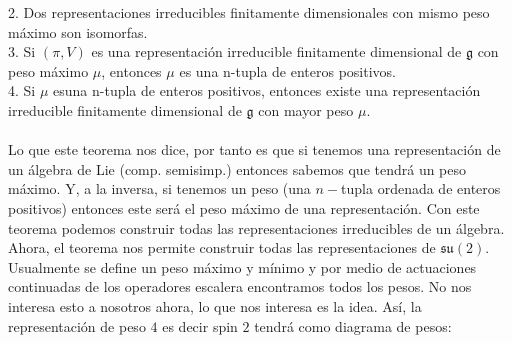 \documentclass[12pt]{article}
\begin{document}
2. Dos representaciones irreducibles finitamente dimensionales con mismo peso máximo son isomorfas. \\
3. Si $(\pi,V)$ es una representación irreducible finitamente dimensional de $\mathfrak{g}$ con peso máximo $\mu$, entonces $\mu$ es una n-tupla de enteros positivos.\\
4. Si $\mu$ esuna n-tupla de enteros positivos, entonces existe una representación irreducible finitamente dimensional de $\mathfrak{g}$ con mayor peso $\mu$.\\\\
Lo que este teorema nos dice, por tanto es que si tenemos una representación de un álgebra de Lie (comp. semisimp.) entonces sabemos que tendrá un peso máximo. Y, a la inversa, si tenemos un peso (una $n-$tupla ordenada de enteros positivos) entonces este será el peso máximo de una representación. Con este teorema podemos construir todas las representaciones irreducibles de un álgebra. \\

Ahora, el teorema nos permite construir todas las representaciones de $\mathfrak{s}\mathfrak{u}(2)$. Usualmente se define un peso máximo y mínimo y por medio de actuaciones continuadas de los operadores escalera encontramos todos los pesos. No nos interesa esto a nosotros ahora, lo que nos interesa es la idea. Así, la representación de peso $4$ es decir spin $2$ tendrá como diagrama de pesos: 
\end{document}

